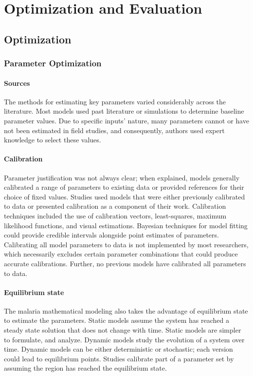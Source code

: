 \documentclass[a4paper, 12pt, twoside]{report}
\begin{document}
\chapter{Optimization and Evaluation}
\section{Optimization}
\subsection{Parameter Optimization}
\subsubsection{Sources}%
The methods for estimating key parameters varied considerably across the literature.
Most models used past literature or simulations to determine baseline parameter values.
Due to specific inputs' nature, many parameters cannot or have not been estimated in field studies, and consequently, authors used expert knowledge to select these values.

\subsubsection{Calibration}%
\label{par:calibration}
Parameter justification was not always clear\cite{Gurarie2007,Arifin2011a,NiazArifin2013}; when explained, models generally calibrated a range of parameters to existing data or provided references for their choice of fixed values.
Studies used models that were either previously calibrated to data or presented calibration as a component of their work.
Calibration techniques included the use of calibration vectors, least-squares, maximum likelihood functions, and visual estimations.
Bayesian techniques for model fitting could provide credible intervals alongside point estimates of parameters.
Calibrating all model parameters to data is not implemented by most researchers, which necessarily excludes certain parameter combinations that could produce accurate calibrations.
Further, no previous models have calibrated all parameters to data.

\subsubsection{Equilibrium state}%
\label{par:equilibrium_state}
The malaria mathematical modeling also takes the advantage of equilibrium state to estimate the parameters\cite{Alves2021}.
Static models assume the system has reached a steady state solution that does not change with time.
Static models are simpler to formulate, and analyze.
Dynamic models study the evolution of a system over time.
Dynamic models can be either deterministic or stochastic; each version could lead to equilibrium points.
Studies calibrate part of a parameter set by assuming the region has reached the equilibrium state.
\end{document}

